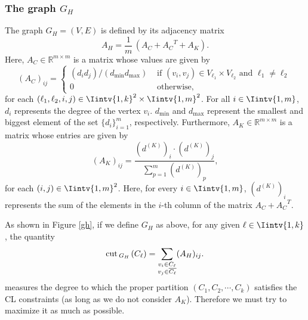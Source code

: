 \subsubsection*{The graph $G_H$}
\begin{definition}
The graph $G_H = (V,E)$ is defined by its adjacency matrix
   \begin{equation}\label{ah}
      A_H = \frac{1}{m} \, (A_C + {A_C}^T + A_K).
   \end{equation}
   Here, $A_C \in \mathbb{R}^{m \times m}$ is a matrix whose values are given by
   \begin{equation}
      (A_C)_{ij} = 
      \begin{cases}
      (d_i d_j)/(d_{\min} d_{\max}) & \text{ if $(v_i, v_j) \in V_{\ell_1} \times V_{\ell_2}$ and $\ell_1 \ne \ell_2$} \\
         0 & \text{ otherwise,}
      \end{cases}
   \end{equation}
   for each $(\ell_1, \ell_2, i, j) \in \Iintv{1,k}^2 \times \Iintv{1,m}^2$. 
   For all $i \in \Iintv{1,m}$, $d_i$ represents the degree of the vertex $v_i$. $d_{\min}$ and $d_{\max}$ represent the smallest and biggest element of the set $\{ d_i \}_{i=1}^m$, respectively.
   Furthermore, $A_K \in \mathbb{R}^{m \times m}$ is a matrix whose entries are given by 
   \begin{equation}
      (A_K)_{ij} = \frac{  \left( d^{(K)} \right) _i \cdot \left( d^{(K)} \right) _j }{ \sum_{p = 1}^m (d^{(K)})_p },
   \end{equation}
   for each $(i,j) \in \Iintv{1,m}^2$. Here, for every $i \in \Iintv{1,m}$, $\left( d^{(K)} \right) _i$ represents the sum of the elements in the $i$-th column of the matrix $A_C + {A_C}^T$.
\end{definition}
As shown in Figure \vref{gh}, if we define $G_H$ as above, for any given $\ell \in \Iintv{1,k}$, the quantity
\begin{equation}
   \operatorname{cut\,} _{G_H \,} (C_{\ell}) = \sum_{\substack{v_i \in C_{\ell} \\ v_j \in \overline{C_{\ell}}}} (A_H)_{ij} .
\end{equation}
measures the degree to which the proper partition $(C_1, C_2, \cdots, C_k)$ satisfies the CL constraints (as long as we do not consider $A_K$). 
Therefore we must try to maximize it as much as possible.

